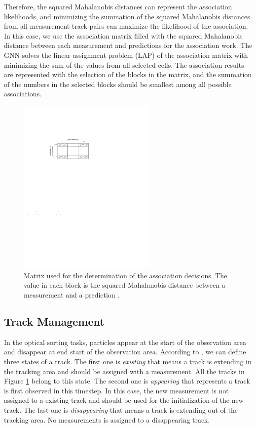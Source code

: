 Therefore, the squared Mahalanobis distances can represent the association likelihoods, and minimizing the summation of the squared Mahalanobis distances from all measurement-track pairs can maximize the likelihood of the association. In this case, we use the association matrix filled with the squared Mahalanobis distance between each measurement and predictions for the association work. The GNN solves the linear assignment problem (LAP) of the association matrix with minimizing the sum of the values from all selected cells. The association results are represented with the selection of the blocks in the matrix, and the summation of the numbers in the selected blocks should be smallest among all possible associations.

\begin{figure}[htb]
\centering
\includegraphics[width=0.6\textwidth]{figures/asso matrix small.pdf}
\caption{Matrix used for the determination of the association decisions. The value in each block is the squared Mahalanobis distance between a measurement and a prediction \cite{pfaff2019multitarget}.}
\label{association matrix simple}
\end{figure}



\subsection{Track Management}

In the optical sorting tasks, particles appear at the start of the observation area and disappear at end start of the observation area. According to \cite{mahler2007statistical}, we can define three states of a track. The first one is \textit{existing} that means a track is extending in the tracking area and should be assigned with a measurement. All the tracks in Figure \ref{association matrix simple} belong to this state. The second one is \textit{appearing} that represents a track is first observed in this timestep. In this case, the new measurement is not assigned to a existing track and should be used for the initialization of the new track. The last one is \textit{disappearing} that means a track is extending out of the tracking area. No measurements is assigned to a disappearing track.

